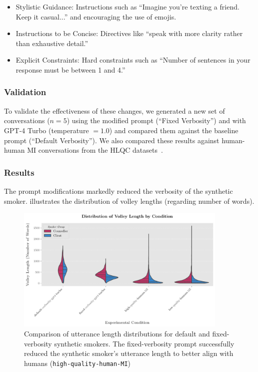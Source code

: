 \begin{itemize}
	\item Stylistic Guidance: Instructions such as ``Imagine you're texting a friend. Keep it casual...'' and encouraging the use of emojis.
	\item Instructions to be Concise: Directives like ``speak with more clarity rather than exhaustive detail.''
	\item Explicit Constraints: Hard constraints such as ``Number of sentences in your response must be between 1 and 4.''
\end{itemize}

\subsubsection{Validation}
To validate the effectiveness of these changes, we generated a new set of conversations ($n=5$) using the modified prompt (``Fixed Verbosity'') and with GPT-4 Turbo (temperature $=1.0$) and compared them against the baseline prompt (``Default Verbosity''). We also compared these results against human-human MI conversations from the HLQC datasets~\citep{perez-rosas-etal-2019-makes}.

\subsubsection{Results}
The prompt modifications markedly reduced the verbosity of the synthetic smoker.  illustrates the distribution of volley lengths (regarding number of words).


\begin{figure}[htpb]
	\centering
	\includegraphics[width=0.9\textwidth]{fig/utterance_length_violin_plot.pdf}
	\caption[Distribution of volley length for default and fixed-verbosity synthetic smokers]{Comparison of utterance length distributions for default and fixed-verbosity synthetic smokers. The fixed-verbosity prompt successfully reduced the synthetic smoker's utterance length to better align with humans (\texttt{high-quality-human-MI})}
	\label{fig:verbosity-comparison}
\end{figure}

